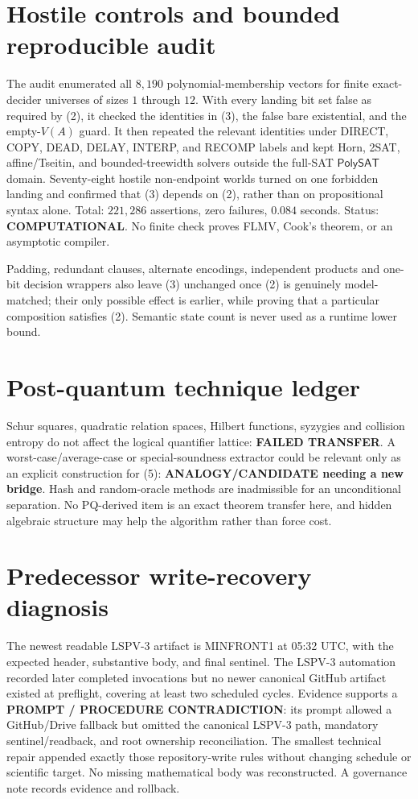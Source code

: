 \documentclass[11pt]{article}
\newcommand{\PolySAT}{\mathsf{PolySAT}}
\newcommand{\COMP}{\textbf{COMPUTATIONAL}}
\begin{document}
\section{Hostile controls and bounded reproducible audit}
The audit enumerated all $8{,}190$ polynomial-membership vectors for finite
exact-decider universes of sizes $1$ through $12$.  With every landing bit
set false as required by (2), it checked the identities in (3), the false
bare existential, and the empty-$V(A)$ guard.  It then repeated the relevant
identities under DIRECT, COPY, DEAD, DELAY, INTERP, and RECOMP labels and
kept Horn, 2SAT, affine/Tseitin, and bounded-treewidth solvers outside the
full-SAT $\PolySAT$ domain.  Seventy-eight hostile non-endpoint worlds turned
on one forbidden landing and confirmed that (3) depends on (2), rather than
on propositional syntax alone.  Total: $221{,}286$ assertions, zero failures,
$0.084$ seconds.  Status: \COMP.  No finite check proves FLMV, Cook's theorem,
or an asymptotic compiler.

Padding, redundant clauses, alternate encodings, independent products and
one-bit decision wrappers also leave (3) unchanged once (2) is genuinely
model-matched; their only possible effect is earlier, while proving that a
particular composition satisfies (2).  Semantic state count is never used
as a runtime lower bound.

\section{Post-quantum technique ledger}
Schur squares, quadratic relation spaces, Hilbert functions, syzygies and
collision entropy do not affect the logical quantifier lattice: \textbf{FAILED
TRANSFER}.  A worst-case/average-case or special-soundness extractor could
be relevant only as an explicit construction for (5):
\textbf{ANALOGY/CANDIDATE needing a new bridge}.  Hash and random-oracle
methods are inadmissible for an unconditional separation.  No PQ-derived
item is an exact theorem transfer here, and hidden algebraic structure may
help the algorithm rather than force cost.

\section{Predecessor write-recovery diagnosis}
The newest readable LSPV-3 artifact is MINFRONT1 at 05:32 UTC, with the
expected header, substantive body, and final sentinel.  The LSPV-3
automation recorded later completed invocations but no newer canonical
GitHub artifact existed at preflight, covering at least two scheduled
cycles.  Evidence supports a \textbf{PROMPT / PROCEDURE CONTRADICTION}:
its prompt allowed a GitHub/Drive fallback but omitted the canonical LSPV-3
path, mandatory sentinel/readback, and root ownership reconciliation.  The
smallest technical repair appended exactly those repository-write rules
without changing schedule or scientific target.  No missing mathematical
body was reconstructed.  A governance note records evidence and rollback.
\end{document}
